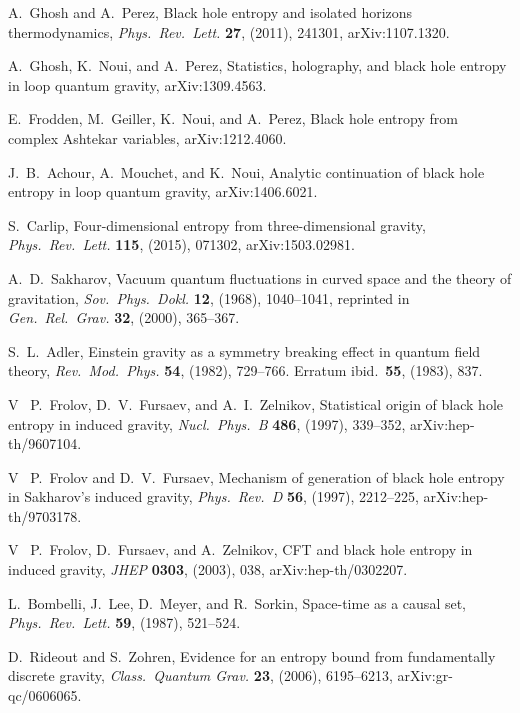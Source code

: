 \documentclass[12pt]{article}
\begin{document}
\begin{thebibliography}{999}
  A.\ Ghosh and A.\ Perez, Black hole entropy and
isolated horizons thermodynamics, \emph{Phys.\ Rev.\ Lett.} {\bf 27},
(2011), 241301, arXiv:1107.1320.

 A.\ Ghosh, K.\ Noui, and A.\ Perez, Statistics, 
holography, and black hole entropy in loop quantum gravity,
arXiv:1309.4563.

 E.\ Frodden, M.\ Geiller, K.\ Noui, and A.\ Perez,
Black hole entropy from complex Ashtekar variables, arXiv:1212.4060.

 J.~B.\ Achour, A.\ Mouchet, and K.\ Noui,
Analytic continuation of black hole entropy in loop quantum 
gravity, arXiv:1406.6021. 

 S.~Carlip, Four-dimensional entropy from 
three-dimensional gravity, \emph{ Phys.\ Rev.\ Lett.} {\bf 115}, 
(2015), 071302, arXiv:1503.02981.

  A.\ D.\ Sakharov, Vacuum quantum fluctuations 
in curved space and the theory of gravitation, \emph{Sov.\ Phys.\ Dokl.}
{\bf 12}, (1968), 1040--1041, reprinted in \emph{Gen.\ Rel.\ Grav.} 
{\bf 32}, (2000), 365--367.

 S.\ L.\ Adler, Einstein gravity as a symmetry breaking 
effect in quantum field theory, \emph{Rev.\ Mod.\ Phys.} {\bf 54}, (1982),
729--766.   Erratum ibid.\ {\bf 55}, (1983), 837.

 V~ P.\ Frolov, D.~V.\ Fursaev, and A.~I.\ Zelnikov,
Statistical origin of black hole entropy in induced gravity,
\emph{Nucl.\ Phys.\ B} {\bf 486}, (1997), 339--352,
arXiv:hep-th/9607104.

 V~ P.\ Frolov and D.~V.\ Fursaev, Mechanism of 
generation of black hole entropy in Sakharov's induced gravity,
\emph{Phys.\ Rev.\ D} {\bf 56}, (1997),  2212--225,
arXiv:hep-th/9703178.

 V~ P.\ Frolov, D.\ Fursaev, and A.\ Zelnikov, 
CFT and black hole entropy in induced gravity, \emph{JHEP}
{\bf 0303}, (2003), 038, arXiv:hep-th/0302207.

  L.\ Bombelli, J.\ Lee, D.\ Meyer, and R.\ Sorkin,
Space-time as a causal set, \emph{Phys.\ Rev.\ Lett.} {\bf 59}, (1987), 
521--524.

 D.\ Rideout and S.\ Zohren, Evidence for an 
entropy bound from fundamentally discrete gravity, \emph{Class.\ 
Quantum Grav.} {\bf 23}, (2006),  6195--6213, arXiv:gr-qc/0606065.


\end{thebibliography}
\end{document}
